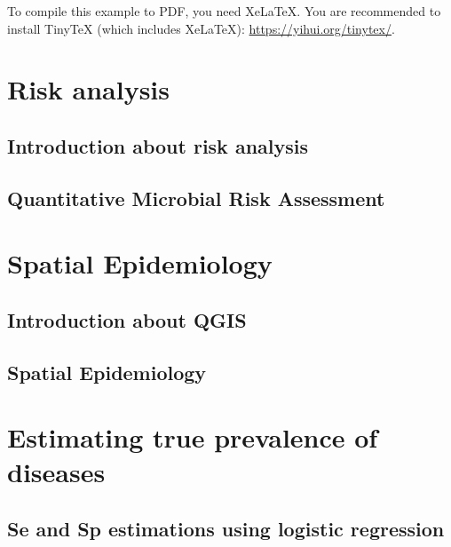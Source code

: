 \documentclass[
]{article}
\begin{document}
To compile this example to PDF, you need XeLaTeX. You are recommended to install TinyTeX (which includes XeLaTeX): \url{https://yihui.org/tinytex/}.

\hypertarget{risk-analysis}{%
\section{Risk analysis}\label{risk-analysis}}

\hypertarget{introduction-about-risk-analysis}{%
\subsection{Introduction about risk analysis}\label{introduction-about-risk-analysis}}

\hypertarget{quantitative-microbial-risk-assessment}{%
\subsection{Quantitative Microbial Risk Assessment}\label{quantitative-microbial-risk-assessment}}

\hypertarget{spatial-epidemiology}{%
\section{Spatial Epidemiology}\label{spatial-epidemiology}}

\hypertarget{introduction-about-qgis}{%
\subsection{Introduction about QGIS}\label{introduction-about-qgis}}

\hypertarget{spatial-epidemiology-1}{%
\subsection{Spatial Epidemiology}\label{spatial-epidemiology-1}}

\hypertarget{estimating-true-prevalence-of-diseases}{%
\section{Estimating true prevalence of diseases}\label{estimating-true-prevalence-of-diseases}}

\hypertarget{se-and-sp-estimations-using-logistic-regression}{%
\subsection{Se and Sp estimations using logistic regression}\label{se-and-sp-estimations-using-logistic-regression}}
\end{document}
